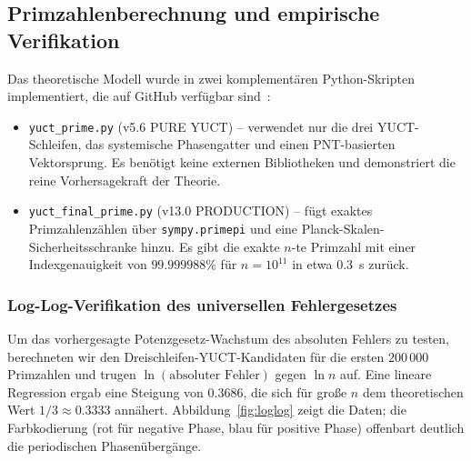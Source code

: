 \documentclass[12pt,a4paper]{article}
\theoremstyle{remark}
\begin{document}
	\subsection{Primzahlenberechnung und empirische Verifikation}
	\label{sec:prime-empirical}
	
	Das theoretische Modell wurde in zwei komplementären Python-Skripten
	implementiert, die auf GitHub verfügbar sind~\cite{PrimeRepo}:
	\begin{itemize}
		\item \texttt{yuct\_prime.py} (v5.6 PURE YUCT) -- verwendet nur die drei
		YUCT-Schleifen, das systemische Phasengatter und einen PNT-basierten
		Vektorsprung. Es benötigt keine externen Bibliotheken und demonstriert die
		reine Vorhersagekraft der Theorie.
		\item \texttt{yuct\_final\_prime.py} (v13.0 PRODUCTION) -- fügt exaktes
		Primzahlenzählen über \texttt{sympy.primepi} und eine Planck-Skalen-
		Sicherheitsschranke hinzu. Es gibt die exakte \(n\)-te Primzahl mit einer
		Indexgenauigkeit von \(99.999988\%\) für \(n=10^{11}\) in etwa \(0.3\)~s
		zurück.
	\end{itemize}
	
	\subsubsection{Log-Log-Verifikation des universellen Fehlergesetzes}
	
	Um das vorhergesagte Potenzgesetz-Wachstum des absoluten Fehlers zu testen,
	berechneten wir den Dreischleifen-YUCT-Kandidaten für die ersten
	\(200\,000\) Primzahlen und trugen \(\ln(\text{absoluter Fehler})\) gegen
	\(\ln n\) auf. Eine lineare Regression ergab eine Steigung von \(0.3686\),
	die sich für große \(n\) dem theoretischen Wert \(1/3 \approx 0.3333\)
	annähert. Abbildung~\ref{fig:loglog} zeigt die Daten; die Farbkodierung
	(rot für negative Phase, blau für positive Phase) offenbart deutlich die
	periodischen Phasenübergänge.
	
\end{document}
